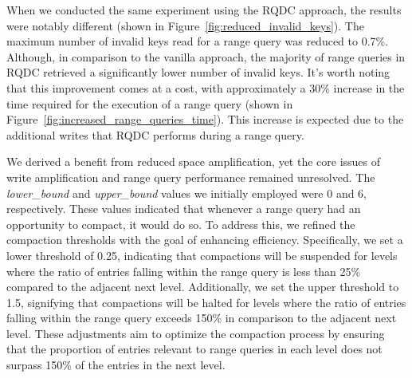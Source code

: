 When we conducted the same experiment using the RQDC approach, the results were notably different (shown in
Figure~\ref{fig:reduced_invalid_keys}). The maximum number of invalid keys read for a range query was reduced to 0.7\%. 
Although, in comparison to the vanilla approach, the majority of range queries in RQDC retrieved a significantly lower 
number of invalid keys. It's worth noting that this improvement comes at a cost, with approximately a 30\% increase in 
the time required for the execution of a range query (shown in Figure~\ref{fig:increased_range_queries_time}). 
This increase is expected due to the additional writes that RQDC performs during a range query.

We derived a benefit from reduced space amplification, yet the core issues of write amplification and range query 
performance remained unresolved. The \textit{lower\_bound} and \textit{upper\_bound} values we initially employed were 0 
and 6, respectively. These values indicated that whenever a range query had an opportunity to compact, it would do so. 
To address this, we refined the compaction thresholds with the goal of enhancing efficiency. Specifically, we set
a lower threshold of 0.25, indicating that compactions will be suspended for levels where the ratio of entries falling
within the range query is less than 25\% compared to the adjacent next level. Additionally, we set the upper threshold 
to 1.5, signifying that compactions will be halted for levels where the ratio of entries falling within the range query 
exceeds 150\% in comparison to the adjacent next level. These adjustments aim to optimize the compaction process by 
ensuring that the proportion of entries relevant to range queries in each level does not surpass 150\% of the entries 
in the next level.

